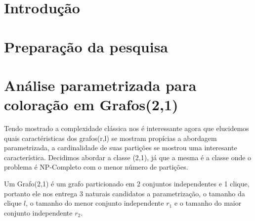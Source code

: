 \documentclass[a4paper,oneside,12pt]{book}
\begin{document}
\thispagestyle{myheadings}



\pagebreak
{}





\chapter{Introdução} \label{cap:introducao}
\chapter{Preparação da pesquisa}

\chapter{Análise parametrizada para coloração em Grafos(2,1)}
Tendo mostrado a complexidade clássica nos é interessante agora que elucidemos quais caractéristicas dos grafos(r,l) se mostram propícias a abordagem parametrizada, a cardinalidade de suas partições se mostrou uma interesante característica.
Decidimos abordar a classe (2,1), já que a mesma é a classe onde o problema é NP-Completo com o menor número de partições.

Um Grafo(2,1) é um grafo particionado em 2 conjuntos independentes e 1 clique, portanto ele nos entrega 3 naturais candidatos a parametrização, o tamanho da clique $l$, o tamanho do menor conjunto independente $r_1$ e o tamanho do maior conjunto independente $r_2$.
\end{document}
